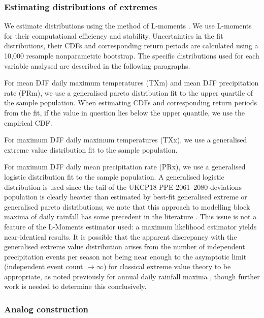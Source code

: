     \subsubsection{Estimating distributions of extremes}

      We estimate distributions using the method of L-moments \citep{hosking_estimation_1985,hosking_l-moments_1990,hosking_regional_1997}. We use L-moments for their computational efficiency and stability. Uncertainties in the fit distributions, their CDFs and corresponding return periods are calculated using a 10,000 resample nonparametric bootstrap. The specific distributions used for each variable analysed are described in the following paragraphs.
      
      For mean DJF daily maximum temperatures (TXm) and mean DJF precipitation rate (PRm), we use a generalised pareto distribution \citep{coles_introduction_2001,hosking_parameter_1987} fit to the upper quartile of the sample population. When estimating CDFs and corresponding return periods from the fit, if the value in question lies below the upper quantile, we use the empirical CDF.

      For maximum DJF daily maximum temperatures (TXx), we use a generalised extreme value distribution fit to the sample population.

      For maximum DJF daily mean precipitation rate (PRx), we use a generalised logistic distribution \citep{hosking_l-moments_1990} fit to the sample population. A generalised logistic distribution is used since the tail of the UKCP18 PPE 2061--2080 deviations population is clearly heavier than estimated by best-fit generalised extreme or generalised pareto distributions; we note that this approach to modelling block maxima of daily rainfall has some precedent in the literature \citep{kysely_probability_2007,wan_zin_best_2009}. This issue is not a feature of the L-Moments estimator used: a maximum likelihood estimator yields near-identical results. It is possible that the apparent discrepancy with the generalised extreme value distribution arises from the number of independent precipitation events per season not being near enough to the asymptotic limit (independent event count $\rightarrow \infty$) for classical extreme value theory to be appropriate, as noted previously for annual daily rainfall maxima \citep{marani_metastatistical_2015}, though further work is needed to determine this conclusively.

    \subsubsection{Analog construction}

